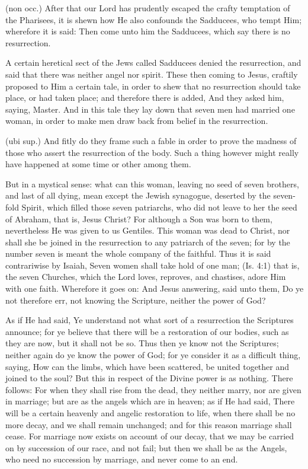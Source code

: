  (non occ.) After that our Lord has prudently escaped the crafty temptation of the Pharisees, it is shewn how He also confounds the Sadducees, who tempt Him; wherefore it is said: Then come unto him the Sadducees, which say there is no resurrection.

 A certain heretical sect of the Jews called Sadducees denied the resurrection, and said that there was neither angel nor spirit. These then coming to Jesus, craftily proposed to Him a certain tale, in order to shew that no resurrection should take place, or had taken place; and therefore there is added, And they asked him, saying, Master. And in this tale they lay down that seven men had married one woman, in order to make men draw back from belief in the resurrection.

 (ubi sup.) And fitly do they frame such a fable in order to prove the madness of those who assert the resurrection of the body. Such a thing however might really have happened at some time or other among them.

 But in a mystical sense: what can this woman, leaving no seed of seven brothers, and last of all dying, mean except the Jewish synagogue, deserted by the seven-fold Spirit, which filled those seven patriarchs, who did not leave to her the seed of Abraham, that is, Jesus Christ? For although a Son was born to them, nevertheless He was given to us Gentiles. This woman was dead to Christ, nor shall she be joined in the resurrection to any patriarch of the seven; for by the number seven is meant the whole company of the faithful. Thus it is said contrariwise by Isaiah, Seven women shall take hold of one man; (Is. 4:1) that is, the seven Churches, which the Lord loves, reproves, and chastises, adore Him with one faith. Wherefore it goes on: And Jesus answering, said unto them, Do ye not therefore err, not knowing the Scripture, neither the power of God?

 As if He had said, Ye understand not what sort of a resurrection the Scriptures announce; for ye believe that there will be a restoration of our bodies, such as they are now, but it shall not be so. Thus then ye know not the Scriptures; neither again do ye know the power of God; for ye consider it as a difficult thing, saying, How can the limbs, which have been scattered, be united together and joined to the soul? But this in respect of the Divine power is as nothing. There follows: For when they shall rise from the dead, they neither marry, nor are given in marriage; but are as the angels which are in heaven; as if He had said, There will be a certain heavenly and angelic restoration to life, when there shall be no more decay, and we shall remain unchanged; and for this reason marriage shall cease. For marriage now exists on account of our decay, that we may be carried on by succession of our race, and not fail; but then we shall be as the Angels, who need no succession by marriage, and never come to an end.

